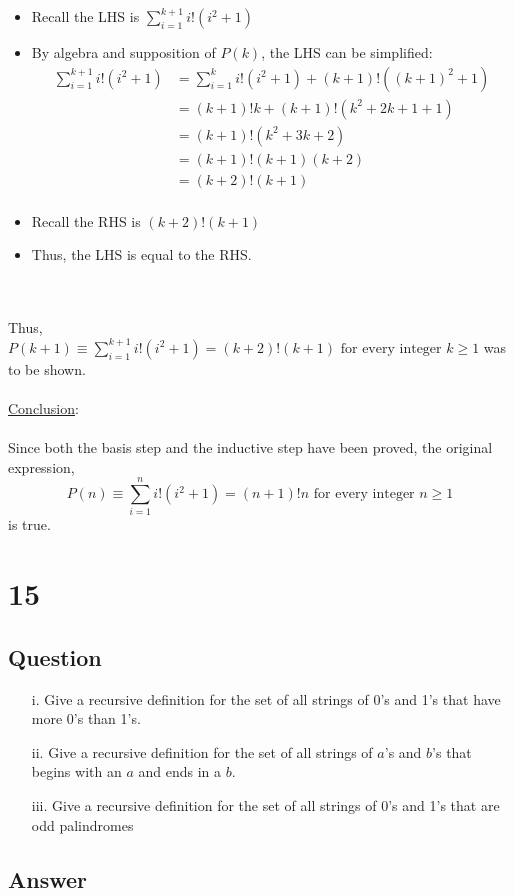\documentclass[12pt]{article}
\newcommand{\xlist}[1]{
    \begin{itemize}
        \renewcommand{\labelitemi}{$\centerdot$}
        #1
    \end{itemize}
    \newblock
    \\ \\
}
\newcommand{\xconclusion}{
    \underline{Conclusion}:
    \\ \\
}
\begin{document}
\xlist{
    \item Recall the LHS is $\sum_{i=1}^{k+1}i!(i^2 + 1)$
    \item By algebra and supposition of $P(k)$, the LHS can be simplified:
    \begin{align*}
        \sum_{i=1}^{k+1}i!(i^2 + 1) &= \sum_{i=1}^{k}i!(i^2 + 1) + (k+1)!((k+1)^2 + 1) \\
        &= (k+1)!k + (k+1)!(k^2 +2k + 1 + 1) \\ 
        &= (k+1)!(k^2 +3k + 2) \\ 
        &= (k+1)!(k+1)(k+2) \\ 
        &= (k+2)!(k+1) \\ 
    \end{align*}
    \item Recall the RHS is $(k+2)!(k+1)$
    \item Thus, the LHS is equal to the RHS.
}
Thus, $P(k+1) \equiv \sum_{i=1}^{k+1}i!(i^2 + 1) = (k+2)!(k+1)\text{ for every integer }k \geq 1$ was to be shown.
\\ \\
\xconclusion
Since both the basis step and the inductive step have been proved, the original expression,
$$P(n) \equiv \sum_{i=1}^{n}i!(i^2 + 1) = (n+1)!n\text{ for every integer }n \geq 1$$
is true.
\section*{15}
\subsection*{Question}
\begin{itemize}
    \item [i.] Give a recursive definition for the set of all strings of 0’s and 1’s that have more 0’s than 1’s.
    \item [ii.] Give a recursive definition for the set of all strings of $a$’s and $b$’s that begins with an $a$ and ends in a $b$.
    \item [iii.] Give a recursive definition for the set of all strings of 0’s and 1’s that are odd palindromes
\end{itemize}
\subsection*{Answer}
\end{document}

